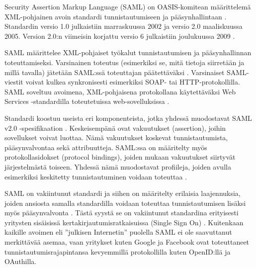 Security Assertion Markup Language (SAML) on OASIS-komitean määrittelemä XML-pohjainen avoin standardi tunnistautumiseen ja pääsynhallintaan \cite{saml_spec}. Standardin versio 1.0 julkaistiin marraskuussa 2002 ja versio 2.0 maaliskuussa 2005. Version 2.0:n viimeisin korjattu versio 6 julkaistiin joulukuussa 2009 \cite{saml_spec}.

SAML määrittelee XML-pohjaiset työkalut tunnistautumisen ja pääsynhallinnan toteuttamiseksi. Varsinainen toteutus (esimerkiksi se, mitä tietoja siirretään ja millä tavalla) jätetään SAML:ssä toteuttajan päätettäväksi \cite{dynamic_saml}. Varsinaiset SAML-viestit voivat kulkea synkronisesti esimerkiksi SOAP- tai HTTP-protokollilla. SAML soveltuu avoimena, XML-pohjaisena protokollana käytettäväksi Web Services -stan\-dar\-dil\-la toteutetuissa web-sovelluksissa \cite{dynamic_saml}.

Standardi koostuu useista eri komponenteista, jotka yhdessä muodostavat SAML v2.0 -spesifikaation \cite{saml_spec}. Keskeisempänä ovat vakuutukset (assertion), joihin sovellukset voivat luottaa. Nämä vakuutukset koskevat tunnistautumista, pääsynvalvontaa sekä attribuutteja. SAML:ssa on määritelty myös protokollasidokset (protocol bindings), joiden mukaan vakuutukset siirtyvät järjestelmästä toiseen. Yhdessä nämä muodostavat profiileja, joiden avulla esimerkiksi keskitetty tunnistautuminen voidaan toteuttaa \cite{saml_spec}.

SAML on vakiintunut standardi ja siihen on määritelty erilaisia laajennuksia, joiden ansiosta samalla standardilla voidaan toteuttaa tunnistautumisen lisäksi myös pääsynvalvonta \cite{saml_spec}. Tästä syystä se on vakiintunut standardina erityisesti yritysten sisäisissä kertakirjautumisratkaisuissa (Single Sign On) \cite{dynamic_saml}. Kuitenkaan kaikille avoimen eli ''julkisen Internetin'' puolella SAML ei ole saavuttanut merkittävää asemaa, vaan yritykset kuten Google ja Facebook ovat toteuttaneet tunnistautumisrajapintansa kevyemmillä protokollilla kuten OpenID:llä ja OAuthilla.